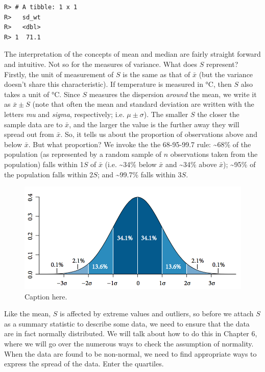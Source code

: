 \documentclass[english,10pt,a4paper,oneside]{book}
\theoremstyle{definition}
\theoremstyle{definition}
\theoremstyle{definition}
\theoremstyle{remark}
\begin{document}
\begin{verbatim}
R> # A tibble: 1 x 1
R>   sd_wt
R>   <dbl>
R> 1  71.1
\end{verbatim}

The interpretation of the concepts of mean and median are fairly
straight forward and intuitive. Not so for the measures of variance.
What does \(S\) represent? Firstly, the unit of measurement of \(S\) is
the same as that of \(\bar{x}\) (but the variance doesn't share this
characteristic). If temperature is measured in °C, then \(S\) also takes
a unit of °C. Since \(S\) measures the dispersion \emph{around} the
mean, we write it as \(\bar{x} \pm S\) (note that often the mean and
standard deviation are written with the letters \emph{mu} and
\emph{sigma}, respectively; i.e. \(\mu \pm \sigma\)). The smaller \(S\)
the closer the sample data are to \(\bar{x}\), and the larger the value
is the further away they will spread out from \(\bar{x}\). So, it tells
us about the proportion of observations above and below \(\bar{x}\). But
what proportion? We invoke the the 68-95-99.7 rule:
\textasciitilde{}68\% of the population (as represented by a random
sample of \(n\) observations taken from the population) falls within
1\(S\) of \(\bar{x}\) (i.e. \textasciitilde{}34\% below \(\bar{x}\) and
\textasciitilde{}34\% above \(\bar{x}\)); \textasciitilde{}95\% of the
population falls within 2\(S\); and \textasciitilde{}99.7\% falls within
3\(S\).

\begin{figure}[h!]
\begin{center}
\includegraphics[width=0.7\linewidth]{figures/Standard_deviation_diagram.png}
\end{center}
\caption{Caption here.}
\end{figure}

Like the mean, \(S\) is affected by extreme values and outliers, so
before we attach \(S\) as a summary statistic to describe some data, we
need to ensure that the data are in fact normally distributed. We will
talk about how to do this in Chapter 6, where we will go over the
numerous ways to check the assumption of normality. When the data are
found to be non-normal, we need to find appropriate ways to express the
spread of the data. Enter the quartiles.
\end{document}
